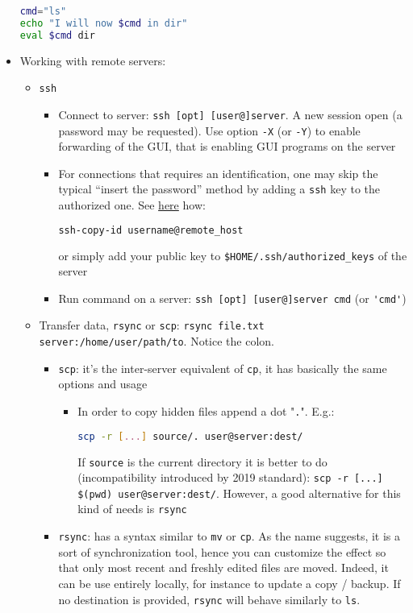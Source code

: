 \documentclass[a4paper,12pt,%
              final%
              ]{article}
\begin{document}
\begin{itemize}
\begin{lstlisting}[language=bash]
cmd="ls"
echo "I will now $cmd in dir"
eval $cmd dir
\end{lstlisting}
  \item Working with remote servers:
    \begin{itemize}
      \item \texttt{ssh}
        \begin{itemize}
          \item Connect to server: \verb|ssh [opt] [user@]server|. A new session open (a password may be requested). Use option \verb|-X| (or \verb|-Y|) to enable forwarding of the GUI, that is enabling GUI programs on the server
          \item For connections that requires an identification, one may skip the typical ``insert the password'' method by adding a \texttt{ssh} key to the authorized one. See \href{https://www.digitalocean.com/community/tutorials/how-to-configure-ssh-key-based-authentication-on-a-linux-server}{here} how:
\begin{lstlisting}[language=bash]
ssh-copy-id username@remote_host
\end{lstlisting}
            or simply add your public key to \verb|$HOME/.ssh/authorized_keys| of the server
          \item Run command on a server: \verb|ssh [opt] [user@]server cmd| (or \verb|'cmd'|)
        \end{itemize}
      \item Transfer data, \texttt{rsync} or \texttt{scp}: \verb|rsync file.txt server:/home/user/path/to|. Notice the colon.
        \begin{itemize}
          \item \texttt{scp}: it's the inter-server equivalent of \texttt{cp}, it has basically the same options and usage
            \begin{itemize}
              \item In order to copy hidden files append a dot "\texttt{.}". E.g.:
\begin{lstlisting}[language=bash]
scp -r [...] source/. user@server:dest/
\end{lstlisting}
                If \texttt{source} is the current directory it is better to do (incompatibility introduced by 2019 standard): \verb|scp -r [...] $(pwd) user@server:dest/|. However, a good alternative for this kind of needs is \verb|rsync|
            \end{itemize}
          \item \texttt{rsync}: has a syntax similar to \texttt{mv} or \texttt{cp}. As the name suggests, it is a sort of synchronization tool, hence you can customize the effect so that only most recent and freshly edited files are moved. Indeed, it can be use entirely locally, for instance to update a copy / backup. If no destination is provided, \texttt{rsync} will behave similarly to \texttt{ls}.

\end{itemize}
\end{itemize}
\end{itemize}
\end{document}
